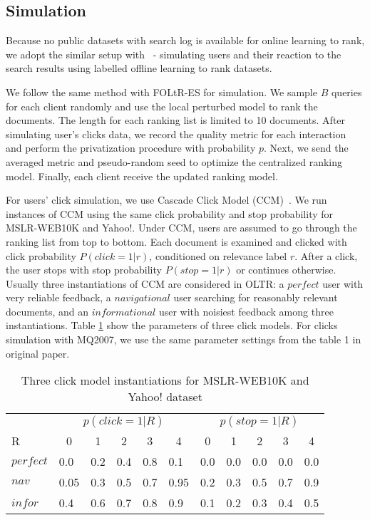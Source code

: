 \subsection{Simulation}

Because no public datasets with search log is available for online learning to rank, we adopt the similar setup with~\cite{DBLP:conf/wsdm/SchuthOWR16, DBLP:conf/wsdm/HofmannSWR13} - simulating users and their reaction to the search results using labelled offline learning to rank datasets.

We follow the same method with FOLtR-ES for simulation. We sample $B$ queries for each client randomly and use the local perturbed model to rank the documents. The length for each ranking list is limited to 10 documents. After simulating user's clicks data, we record the quality metric for each interaction and perform the privatization procedure with probability $p$. Next, we send the averaged metric and pseudo-random seed to optimize the centralized ranking model. Finally, each client receive the updated ranking model. 

For users' click simulation, we use Cascade Click Model (CCM)~\cite{DBLP:conf/wsdm/GuoLW09}. We run instances of CCM using the same click probability and stop probability for MSLR-WEB10K and Yahoo!. Under CCM, users are assumed to go through the ranking list from top to bottom. Each document is examined and clicked with click probability $P(click = 1 | r)$, conditioned on relevance label $r$. After a click, the user stops with stop probability $P(stop = 1 | r)$ or continues otherwise. Usually three instantiations of CCM are considered in OLTR: a $perfect$ user with very reliable feedback, a $navigational$ user searching for reasonably relevant documents, and an $informational$ user with noisiest feedback among three instantiations.  Table \ref{mslr-CCM} show the parameters of three click models. For clicks simulation with MQ2007, we use the same parameter settings from the table 1 in original paper.


\newcommand{\tc}[1]{\multicolumn{1}{c}{#1}}
\setlength{\tabcolsep}{3mm}

\begin{table}[t!]
	\centering
	\caption[centre]{Three click model instantiations for MSLR-WEB10K and Yahoo! dataset}\label{mslr-CCM}
	\begin{tabularx}{\textwidth}{XXXXXXXXXXX}
		\toprule
		& \multicolumn{5}{c}{$p(click=1|R)$} & \multicolumn{5}{c}{$p(stop=1|R)$} \\
		\cmidrule(r){2-6}  \cmidrule(){7-11}
		R & \tc{0}& \tc{1} &\tc{2} & \tc{3}& \tc{4}&  \tc{0} & \tc{1} & \tc{2} & \tc{3} & \tc{4} \\
		\midrule
		$perfect$ & 0.0 & 0.2 & 0.4 & 0.8 & 0.1& 0.0 & 0.0 & 0.0 & 0.0 & 0.0\\
		$nav$ & 0.05 & 0.3 & 0.5 & 0.7 & 0.95& 0.2 & 0.3 & 0.5 & 0.7 & 0.9\\
		$infor$ & 0.4 & 0.6 & 0.7 & 0.8 & 0.9& 0.1 & 0.2 & 0.3 & 0.4 & 0.5\\
		\bottomrule
	\end{tabularx}
	\vspace{-10pt}
\end{table}

